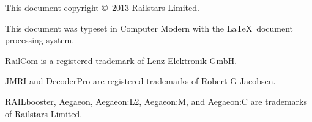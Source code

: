 \documentclass[12pt,letterpaper,draft]{memoir} %
\begin{document}
\printindex

\newpage

This document copyright \copyright \ 2013 Railstars Limited.

This document was typeset in Computer Modern with the \LaTeX \ document processing system.

RailCom\textsuperscript{\textregistered} is a registered trademark of Lenz Elektronik GmbH.

JMRI\textsuperscript{\textregistered} and DecoderPro\textsuperscript{\textregistered} are registered trademarks of Robert G Jacobsen.

RAILbooster\textsuperscript{\texttrademark}, Aegaeon\textsuperscript{\texttrademark}, Aegaeon:L2\textsuperscript{\texttrademark}, Aegaeon:M\textsuperscript{\texttrademark}, and Ae\-gae\-on:C\textsuperscript{\texttrademark}  are trademarks of Railstars Limited.
\end{document}
